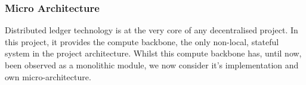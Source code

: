 \subsubsection{Micro Architecture}

Distributed ledger technology is at the very core of any decentralised project. In this project, it provides the compute backbone, the only non-local, stateful system in the project architecture. Whilst this compute backbone has, until now, been observed as a monolithic module, we now consider it's implementation and own micro-architecture.

